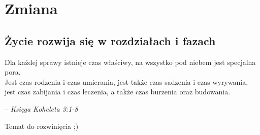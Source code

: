 \documentclass[../dotknieci-miloscia.tex]{subfiles}
\begin{document}
\section{Zmiana}
\label{sztuka/zmiana}


\begin{multicols}{2}


\subsection{Życie rozwija się w rozdziałach i fazach}


\epigraph{%
    Dla każdej sprawy istnieje czas właściwy,
    na wszystko pod niebem jest specjalna pora. \\
    Jest czas rodzenia i czas umierania, 
    jest także czas sadzenia i czas wyrywania, \\
    jest czas zabijania i czas leczenia,
    a także czas burzenia oraz budowania.
}{-- \small\emph{Księga Koheleta 3:1-8 \cite{ecclesiastes:npd}}}

Temat do rozwinięcia ;)


\end{multicols}
\end{document}
